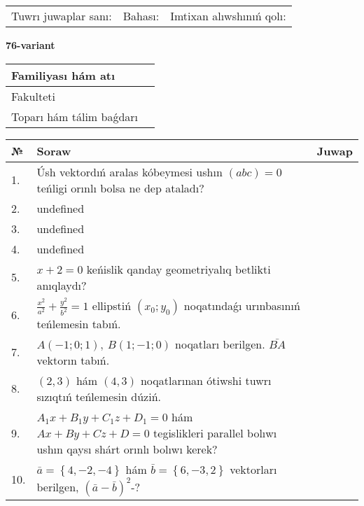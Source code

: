 \documentclass{article}
\begin{document}
\vspace{0.7cm}

\begin{tabular}{lll}
Tuwrı juwaplar sanı: \underline{\hspace{1cm}} & 
Bahası: \underline{\hspace{1cm}} & 
Imtixan alıwshınıń qolı: \underline{\hspace{2cm}} \\
\end{tabular}

\egroup

\newpage


\textbf{76-variant}\\

\bgroup
\def\arraystretch{1.6} %

\begin{tabular}{|m{5.7cm}|m{9.5cm}|}
\hline
Familiyası hám atı & \\
\hline
Fakulteti  & \\
\hline
Toparı hám tálim baǵdarı  & \\
\hline
\end{tabular}

\vspace{0.7cm}

\begin{tabular}{|m{0.7cm}|m{10cm}|m{4cm}|}
\hline
№ & Soraw & Juwap \\
\hline
1. & Úsh vektordıń aralas kóbeymesi ushın \((abc) = 0\) teńligi orınlı bolsa ne dep ataladı? &  \\
\hline
2. & undefined &  \\
\hline
3. & undefined &  \\
\hline
4. & undefined &  \\
\hline
5. & \(x + 2 = 0\) keńislik qanday geometriyalıq betlikti anıqlaydı? &  \\
\hline
6. & \(\frac{x^{2}}{a^{2}} + \frac{y^{2}}{b^{2}} = 1\) ellipstiń \((x_{0};y_{0})\) noqatındaǵı urınbasınıń teńlemesin tabıń. &  \\
\hline
7. & \(A (- 1;0;1),\ B (1; - 1;0)\) noqatları berilgen. \(\bar{BA}\) vektorın tabıń. &  \\
\hline
8. & $(2, 3)$ hám $(4, 3)$ noqatlarınan ótiwshi tuwrı sızıqtıń teńlemesin dúziń. &  \\
\hline
9. & \(A_{1}x + B_{1}y + C_{1}z + D_{1} = 0\) hám \(Ax + By + Cz + D = 0\) tegislikleri parallel bolıwı ushın qaysı shárt orınlı bolıwı kerek? &  \\
\hline
10. & \(\bar{a} = \left\{ 4,- 2,- 4 \right\}\) hám \(\bar{b} = \left\{ 6,- 3, 2 \right\}\) vektorları berilgen, \((\bar{a} - \bar{b}) ^{2}\)-? & \\
\hline
\end{tabular}
\end{document}
